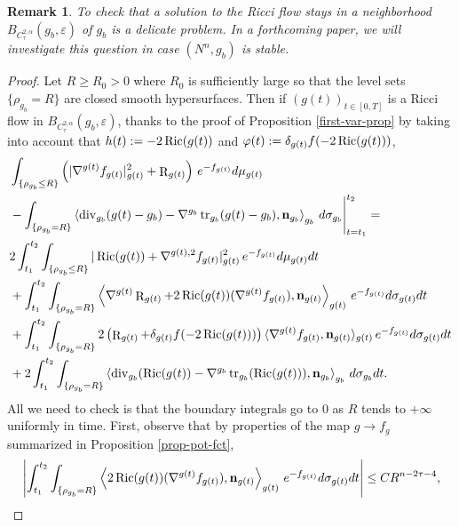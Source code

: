 \documentclass[a4paper,11pt,reqno]{amsart}
\newtheorem{rk}[defn]{Remark}
\def\Ric{\mathop{\rm Ric}\nolimits}
\def\tr{\mathop{\rm tr}\nolimits}
\def\div{\mathop{\rm div}\nolimits}
\def\Ric{\mathop{\rm Ric}\nolimits}
\def\tr{\mathop{\rm tr}\nolimits}
\def\div{\mathop{\rm div}\nolimits}
\def\R{\mathop{\rm R}\nolimits}
\numberwithin{equation}{section}
\begin{document}
	\begin{rk}
		To check that a solution to the Ricci flow stays in a neighborhood $B_{C^{2,\alpha}_{\tau}}(g_b,\varepsilon)$ of $g_b$ is a delicate problem. In a forthcoming paper, we will investigate this question in case $(N^n,g_b)$ is stable.
	\end{rk}
	\begin{proof}
	Let $R\geq R_0>0$ where $R_0$ is sufficiently large so that the level sets $\{\rho_{g_b}=R\}$ are closed smooth hypersurfaces. Then if $(g(t))_{t\in[0,T]}$ is a Ricci flow in $B_{C^{2,\alpha}_{\tau}}(g_b,\varepsilon)$, thanks to the proof of Proposition \ref{first-var-prop} by taking into account that $h(t):=-2\Ric(g(t))$ and $\varphi(t):=\delta_{g(t)}f(-2\Ric(g(t)))$,
	\begin{equation}
	\begin{split}\label{delicate-first-var}
&\int_{\{\rho_{g_b}\leq R\}}\left(|\nabla^{g(t)}f_{g(t)}|^2_{g(t)}+\R_{g(t)}\right)\,e^{-f_{g(t)}}d\mu_{g(t)}\\
&-\int_{\{\rho_{g_b}=R\}}\left<\div_{g_b}(g(t)-g_b)-\nabla^{g_b}\tr_{g_b}(g(t)-g_b),\mathbf{n}_{g_b}\right>_{g_b}\,d\sigma_{g_b}\Bigg\rvert_{t=t_1}^{t_2}=\\
&2\int_{t_1}^{t_2}\int_{\{\rho_{g_b}\leq R\}}|\Ric(g(t))+\nabla^{g(t),2}f_{g(t)}|^2_{g(t)}\,e^{-f_{g(t)}}d\mu_{g(t)}dt\\
&+\int_{t_1}^{t_2}\int_{\{\rho_{g_b}=R\}}\left<\nabla^{g(t)}\R_{g(t)}+2\Ric(g(t))(\nabla^{g(t)}f_{g(t)}),\mathbf{n}_{g(t)}\right>_{g(t)}\,e^{-f_{g(t)}}d\sigma_{g(t)}dt\\
&+\int_{t_1}^{t_2}\int_{\{\rho_{g_b}= R\}}2\left(\R_{g(t)}+\delta_{g(t)}f(-2\Ric(g(t)))\right)\langle\nabla^{g(t)}f_{g(t)},\mathbf{n}_{g(t)}\rangle_{g(t)}\,e^{-f_{g(t)}}d\sigma_{g(t)}dt\\
&+2\int_{t_1}^{t_2}\int_{\{\rho_{g_b}=R\}}\left<\div_{g_b}(\Ric(g(t))-\nabla^{g_b}\tr_{g_b}(\Ric(g(t))),\mathbf{n}_{g_b}\right>_{g_b}\,d\sigma_{g_b}dt.
\end{split}
\end{equation}
All we need to check is that the boundary integrals go to $0$ as $R$ tends to $+\infty$ uniformly in time. First, observe that by properties of the map $g\rightarrow f_g$ summarized in Proposition \ref{prop-pot-fct},
	\begin{equation}
	\begin{split}\label{easy-peasy-est}
&\left|\int_{t_1}^{t_2}\int_{\{\rho_{g_b}=R\}}\left<2\Ric(g(t))(\nabla^{g(t)}f_{g(t)}),\mathbf{n}_{g(t)}\right>_{g(t)}\,e^{-f_{g(t)}}d\sigma_{g(t)}dt\right|\leq CR^{n-2\tau-4},\\

\end{split}
\end{equation}
\end{proof}
\end{document}
